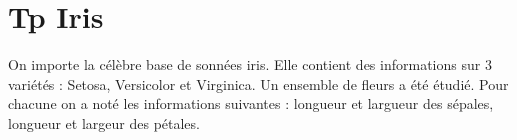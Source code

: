 \documentclass[letterpaper,10pt,english]{jupyterBook}
\begin{document}
\chapter{Tp Iris}
\label{\detokenize{notebooks/Machine-Learning/TP-Iris:tp-iris}}\label{\detokenize{notebooks/Machine-Learning/TP-Iris::doc}}\begin{sphinxVerbatimInput}

\begin{sphinxVerbatim}[commandchars=\\\{\}]
   
   
   
   
   
\end{sphinxVerbatim}
\end{sphinxVerbatimInput}

\sphinxAtStartPar
On importe la célèbre base de sonnées iris. Elle contient des informations sur 3 variétés : Setosa, Versicolor et Virginica. Un ensemble de fleurs a été étudié. Pour chacune on a noté les informations suivantes : longueur et largueur des sépales, longueur et largeur des pétales.
\end{document}

